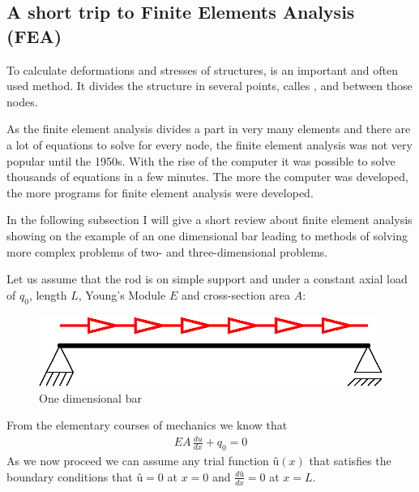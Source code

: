 \subsection{A short trip to Finite Elements Analysis (FEA)}
To calculate deformations and stresses of structures,  is an important and often used method. It divides the structure in several points, calles , and  between those nodes. 
\bigskip

As the finite element analysis divides a part in very many elements and there are a lot of equations to solve for every node, the finite element analysis was not very popular until the 1950s. With the rise of the computer it was possible to solve thousands of equations in a few minutes. The more the computer was developed, the more programs for finite element analysis were developed.
\bigskip

In the following subsection I will give a short review about finite element analysis showing on the example of an one dimensional bar leading to methods of solving more complex problems of two- and three-dimensional problems.
\bigskip

Let us assume that the rod is on simple support and under a constant axial load of $q_0$, length $L$, Young's Module $E$ and cross-section area $A$:
\bigskip

\begin{figure}
\begin{center}
\includegraphics[scale=1]{figs/OneDimensionalBar}
\caption{One dimensional bar}
\end{center}
\end{figure}

\bigskip
From the elementary courses of mechanics we know that
\begin{align}
EA\,\frac{du}{dx}+q_0=0 \label{Rod_Main}
\end{align}
As we now proceed we can assume any trial function $û(x)$ that satisfies the boundary conditions that $û=0$ at $x=0$ and $\frac{dû}{dx}=0$ at $x=L$.

